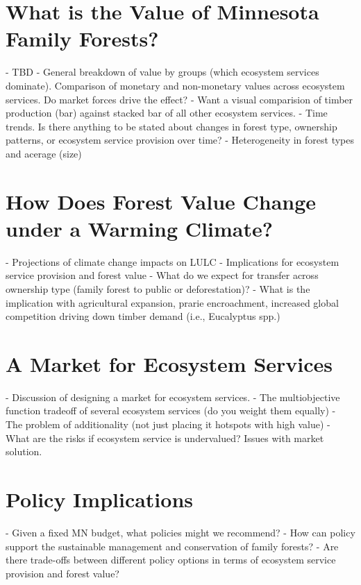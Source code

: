 \documentclass[11pt]{article}
\begin{document}
\section{What is the Value of Minnesota Family Forests?}

- TBD
- General breakdown of value by groups (which ecosystem services dominate). Comparison of monetary and non-monetary values across ecosystem services. Do market forces drive the effect? 
	- Want a visual comparision of timber production (bar) against stacked bar of all other ecosystem services. 
- Time trends. Is there anything to be stated about changes in forest type, ownership patterns, or ecosystem service provision over time?
- Heterogeneity in forest types and acerage (size)

\section{How Does Forest Value Change under a Warming Climate?}

- Projections of climate change impacts on LULC
- Implications for ecosystem service provision and forest value
- What do we expect for transfer across ownership type (family forest to public or deforestation)?
- What is the implication with agricultural expansion, prarie encroachment, increased global competition driving down timber demand (i.e., Eucalyptus spp.)

\section{A Market for Ecosystem Services}

- Discussion of designing a market for ecosystem services. 
- The multiobjective function tradeoff of several ecosystem services (do you weight them equally)
- The problem of additionality (not just placing it hotspots with high value)
- What are the risks if ecosystem service is undervalued? Issues with market solution. 


\section{Policy Implications}

- Given a fixed MN budget, what policies might we recommend?
- How can policy support the sustainable management and conservation of family forests?
- Are there trade-offs between different policy options in terms of ecosystem service provision and forest value?
\end{document}
